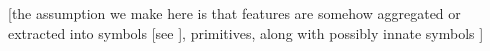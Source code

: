 



[the assumption we make here is that features are somehow aggregated or extracted into symbols [see \cite{garcez_neurosymbolic_2020}], primitives, along with possibly innate symbols \cite{Lake_Ullman_Tenenbaum_Gershman_2017}] 








